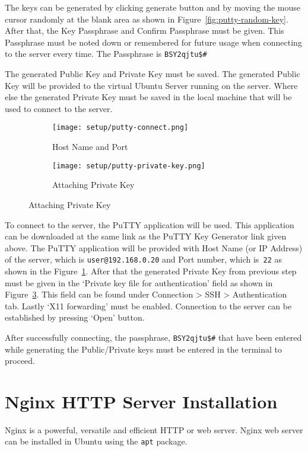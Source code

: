 The keys can be generated by clicking generate button and by moving the mouse cursor randomly at the blank area as shown in Figure~\ref{fig:putty-random-key}. After that, the Key Passphrase and Confirm Passphrase must be given. This Passphrase must be noted down or remembered for future usage when connecting to the server every time. The Passphrase is \texttt{BSY2qjtu\$\#}

The generated Public Key and Private Key must be saved. The generated Public Key will be provided to the virtual Ubuntu Server running on the server. Where else the generated Private Key must be saved in the local machine that will be used to connect to the server.

\begin{figure}[ht]
\centering
	\begin{subfigure}{.49\linewidth}
	\caption{Host Name and Port}
	\label{fig:putty-connect}
	\centering
	\texttt{[image: setup/putty-connect.png]}
	\end{subfigure}
	\begin{subfigure}{.49\linewidth}
	\caption{Attaching Private Key}
	\label{fig:putty-private-key}
	\centering
	\texttt{[image: setup/putty-private-key.png]}
	\end{subfigure}
\end{figure}

To connect to the server, the PuTTY application will be used. This application can be downloaded at the same link as the PuTTY Key Generator link given above. The PuTTY application will be provided with Host Name (or IP Address) of the server, which is \texttt{user@192.168.0.20} and Port number, which is\texttt{ 22} as shown in the Figure~\ref{fig:putty-connect}. After that the generated Private Key from previous step must be given in the ‘Private key file for authentication’ field as shown in Figure~\ref{fig:putty-private-key}. This field can be found under Connection > SSH > Authentication tab. Lastly ‘X11 forwarding’ must be enabled. Connection to the server can be established by pressing ‘Open’ button.

After successfully connecting, the passphrase, \texttt{BSY2qjtu\$\#} that have been entered while generating the Public/Private keys must be entered in the terminal to proceed.

\section{Nginx HTTP Server Installation} \label{sec:nginx-http-server-installation}
Nginx is a powerful, versatile and efficient HTTP or web server. Nginx web server can be installed in Ubuntu using the \texttt{apt} package.

